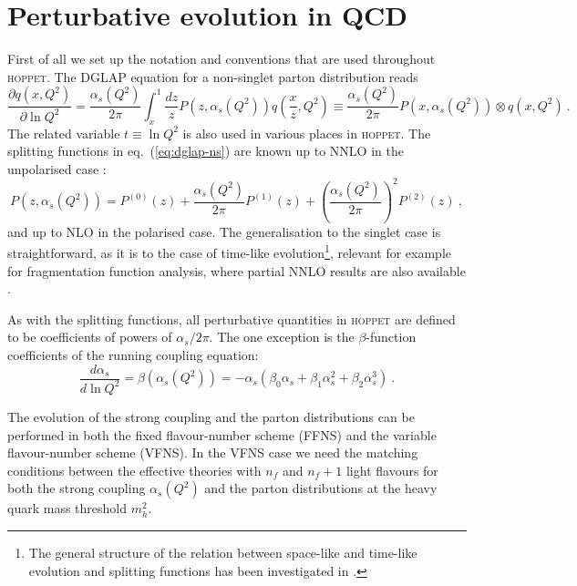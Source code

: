 \documentclass[12pt]{article}
\newcommand{\lp}{\left(}
\newcommand{\rp}{\right)}
\newcommand{\aq}{\alpha_s\left( Q^2 \right)}
\newcommand{\as}{\alpha_s}
\newcommand{\hoppet}{\textsc{hoppet}\xspace}
\begin{document}
\section{Perturbative evolution in QCD}
\label{sec:pqcd}
First of all we set up the notation and
conventions that are used throughout \hoppet. The DGLAP
equation for a non-singlet parton distribution reads
\begin{equation}
  \label{eq:dglap-ns}
  \frac{\partial q(x,Q^2)}{\partial \ln Q^2} = 
\frac{\aq}{2\pi}\int_x^1 \frac{dz}{z}
  P(z,\aq) q\lp \frac{x}{z},Q^2\rp \equiv 
\frac{\aq}{2\pi}  P(x,\aq) \otimes q\lp x,Q^2\rp \ .
\end{equation}
The related variable $t\equiv \ln Q^2$ is also used
in various places in \hoppet.
The splitting functions in eq.~(\ref{eq:dglap-ns})
are known up to NNLO in the 
unpolarised case \cite{CFP,NNLO-NS,NNLO-singlet}:
\begin{equation}
  \label{eq:dpdf}
   P(z,\aq)=P^{(0)}(z)+\frac{\aq}{2\pi}P^{(1)}(z)+
\lp \frac{\aq}{2\pi} \rp^2 P^{(2)}(z) \ ,
\end{equation}
and up to NLO \cite{Mertig:1995ny,Vogelsang:1996im} in the polarised case.
The generalisation to the singlet case is straightforward, as it
is 
to the case of time-like evolution\footnote{
The general structure of the relation between space-like
and time-like evolution and splitting functions
 has been investigated in \cite{CFP,Stratmann:1996hn,Dokshitzer:2005bf,Mitov:2006ic,Basso:2006nk,Dokshitzer:2006nm,Beccaria:2007bb}.}, 
relevant for example for fragmentation function analysis,
where partial NNLO results
are also available \cite{Mitov:2006ic}.


As with the splitting functions, all perturbative quantities in
\hoppet are defined to be coefficients of powers of $\as/2\pi$. The one
exception is the $\beta$-function coefficients of the running
coupling equation:
\begin{equation}
  \label{eq:as-ev}
  \frac{d\as}{d\ln Q^2} = \beta\lp \aq\rp = -\as (\beta_0\as +
  \beta_1\as^2 + 
  \beta_2\as^3) \ .
\end{equation}

The evolution of the strong coupling and the parton distributions can
be performed in both the fixed flavour-number scheme (FFNS) and the 
variable flavour-number scheme (VFNS). In the VFNS case we 
need the matching conditions between the effective
theories with $n_f$ and $n_{f}+1$ light flavours for both the strong 
coupling $\aq$ and the parton distributions at the heavy quark
mass threshold $m_h^2$.
\end{document}
